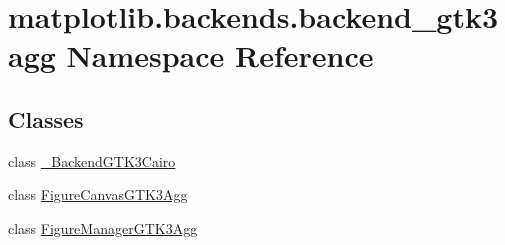 \hypertarget{namespacematplotlib_1_1backends_1_1backend__gtk3agg}{}\section{matplotlib.\+backends.\+backend\+\_\+gtk3agg Namespace Reference}
\label{namespacematplotlib_1_1backends_1_1backend__gtk3agg}
\subsection*{Classes}
\begin{DoxyCompactItemize}
\item 
class \hyperlink{classmatplotlib_1_1backends_1_1backend__gtk3agg_1_1__BackendGTK3Cairo}{\+\_\+\+Backend\+G\+T\+K3\+Cairo}
\item 
class \hyperlink{classmatplotlib_1_1backends_1_1backend__gtk3agg_1_1FigureCanvasGTK3Agg}{Figure\+Canvas\+G\+T\+K3\+Agg}
\item 
class \hyperlink{classmatplotlib_1_1backends_1_1backend__gtk3agg_1_1FigureManagerGTK3Agg}{Figure\+Manager\+G\+T\+K3\+Agg}
\end{DoxyCompactItemize}
